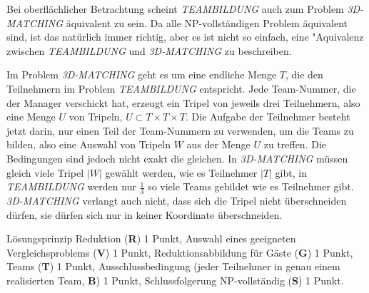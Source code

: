 \begin{diskussion}
Bei oberflächlicher Betrachtung scheint \textsl{TEAMBILDUNG} auch
zum Problem \textsl{3D-MATCHING} äquivalent zu sein. Da alle NP-vollständigen
Problem äquivalent sind, ist das natürlich immer richtig, aber
es ist nicht so einfach, eine "Aquivalenz zwischen 
\textsl{TEAMBILDUNG} und 
\textsl{3D-MATCHING} zu beschreiben.

Im Problem \textsl{3D-MATCHING} geht es um eine endliche Menge $T$,
die den Teilnehmern im Problem \textsl{TEAMBILDUNG} entspricht.
Jede Team-Nummer, die der Manager verschickt hat, erzeugt ein Tripel
von jeweils drei Teilnehmern, also eine Menge $U$ von Tripeln,
$U\subset T\times T\times T$. Die Aufgabe der Teilnehmer besteht
jetzt darin, nur einen Teil der Team-Nummern zu verwenden, um
die Teams zu bilden, also eine Auswahl von Tripeln $W$ aus der Menge $U$
zu treffen. Die Bedingungen sind jedoch nicht exakt die gleichen.
In \textsl{3D-MATCHING} müssen gleich viele Tripel $|W|$
gewählt werden, wie es Teilnehmer $|T|$ gibt, in 
\textsl{TEAMBILDUNG} werden nur $\frac13$ so viele Teams gebildet
wie es Teilnehmer gibt. \textsl{3D-MATCHING} verlangt auch nicht,
dass sich die Tripel nicht überschneiden dürfen, sie dürfen sich
nur in keiner Koordinate überschneiden.
\end{diskussion}

\begin{bewertung}
Lösungsprinzip Reduktion ({\bf R}) 1 Punkt,
Auswahl eines geeigneten Vergleichsproblems ({\bf V}) 1 Punkt,
Reduktionsabbildung für Gäste ({\bf G}) 1 Punkt,
Teams ({\bf T}) 1 Punkt,
Ausschlussbedingung (jeder Teilnehmer in genau einem realisierten Team,
{\bf B}) 1 Punkt,
Schlussfolgerung NP-vollständig ({\bf S}) 1 Punkt.
\end{bewertung}
